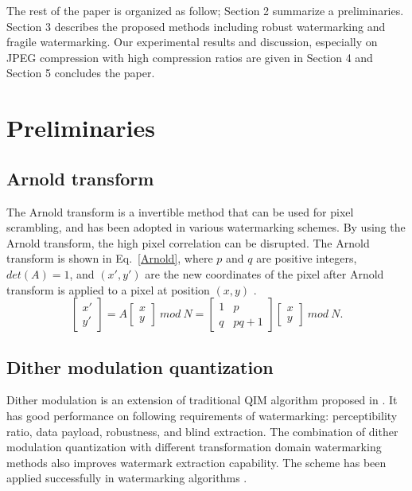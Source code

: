 \documentclass[runningheads]{llncs}
\begin{document}
The rest of the paper is organized as follow; Section 2 summarize a preliminaries. Section 3 describes the proposed methods including robust watermarking and fragile watermarking. Our experimental results and discussion, especially on JPEG compression with high compression ratios are given in Section 4 and Section 5 concludes the paper.

\section{Preliminaries}
\subsection{Arnold transform}
The Arnold transform is a invertible method that can be used for pixel scrambling, and has been adopted in various watermarking schemes. By using the Arnold transform, the high pixel correlation can be disrupted. The Arnold transform is shown in Eq.~\ref{Arnold}, where $p$ and $q$ are positive integers, $det(A) = 1$, and $(x', y')$ are the new coordinates of the pixel after Arnold transform is applied to a pixel at position $(x, y)$ \cite{Chow2017}.
\begin{equation}
\left[\begin{array}{c}x'\\y'\end{array}\right]=A\left[\begin{array}{c}x\\y\end{array}\right]\ mod\ N=\left[\begin{array}{cc}1 & p\\q & pq+1\end{array}\right]\left[\begin{array}{c}x\\y\end{array}\right]\ mod\ N.
\label{Arnold}
\end{equation}
\subsection{Dither modulation quantization}
Dither modulation is an extension of traditional QIM algorithm proposed in \cite{chen2001quantization}. It has good performance on following requirements of watermarking: perceptibility ratio, data payload, robustness, and blind extraction. The combination of dither modulation quantization with different transformation domain watermarking methods also improves watermark extraction capability. The scheme has been applied successfully in watermarking algorithms \cite{avila2018watermarking,deng2009local,papakostas2014moment,zhu2016optimal}.
\end{document}
